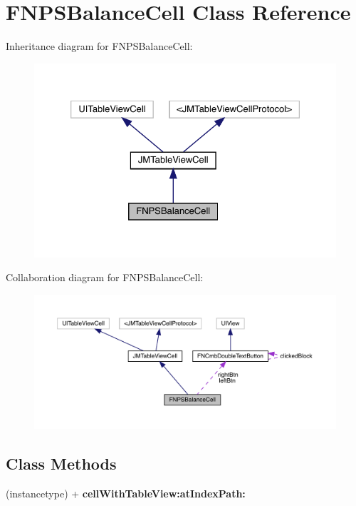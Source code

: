 \hypertarget{interface_f_n_p_s_balance_cell}{}\section{F\+N\+P\+S\+Balance\+Cell Class Reference}
\label{interface_f_n_p_s_balance_cell}


Inheritance diagram for F\+N\+P\+S\+Balance\+Cell\+:\nopagebreak
\begin{figure}[H]
\begin{center}
\leavevmode
\includegraphics[width=326pt]{interface_f_n_p_s_balance_cell__inherit__graph}
\end{center}
\end{figure}


Collaboration diagram for F\+N\+P\+S\+Balance\+Cell\+:\nopagebreak
\begin{figure}[H]
\begin{center}
\leavevmode
\includegraphics[width=350pt]{interface_f_n_p_s_balance_cell__coll__graph}
\end{center}
\end{figure}
\subsection*{Class Methods}
\begin{DoxyCompactItemize}
\item 
\mbox{\label{interface_f_n_p_s_balance_cell_a72977c568e7456b4b129fd6983df88b7}} 
(instancetype) + {\bfseries cell\+With\+Table\+View\+:at\+Index\+Path\+:}
\end{DoxyCompactItemize}

